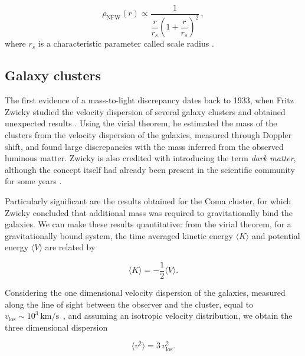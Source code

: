\begin{equation} \label{NFW}
\rho_{\mathrm{NFW}}(r)\propto \frac{1}{\dfrac{r}{r_s}\left(1+\dfrac{r}{r_s}\right)^2}\,,
\end{equation}
where $r_s$ is a characteristic parameter called scale radius \cite{Lisanti:ICTP:2018:DM}.




\subsection{Galaxy clusters}


The first evidence of a mass-to-light discrepancy dates back to 1933, when Fritz Zwicky studied the velocity dispersion of several galaxy clusters and obtained unexpected results \cite{Zwicky1933,Zwicky}.
Using the virial theorem, he estimated the mass of the clusters from the velocity dispersion of the galaxies, measured through Doppler shift, and found large discrepancies with the mass inferred from the observed luminous matter.
Zwicky is also credited with introducing the term \emph{dark matter}, although the concept itself had already been present in the scientific community for some years \cite{History}.

Particularly significant are the results obtained for the Coma cluster, for which Zwicky concluded that additional mass was required to gravitationally bind the galaxies.
We can make these results quantitative: from the virial theorem, for a gravitationally bound system, the time averaged kinetic energy $\langle K \rangle$ and potential energy $\langle V \rangle$ are related by


\begin{equation}\label{eq:viriale}
\langle K \rangle = -\frac{1}{2}\langle V \rangle.
\end{equation}

Considering the one dimensional velocity dispersion of the galaxies, measured along the line of sight between the observer and the cluster, 
equal to $v_{\text{los}} \sim 10^{3}\ \mathrm{km/s}$~\cite{History}, and assuming an isotropic velocity distribution, we obtain the three dimensional dispersion


\begin{equation}
\langle v^{2}\rangle = 3\,v_{\text{los}}^{2}.
\end{equation}

